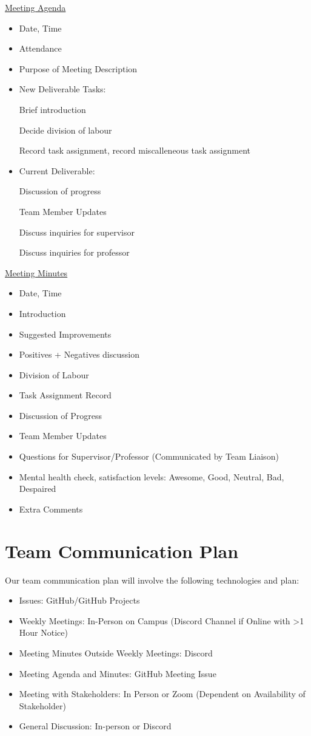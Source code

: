 \documentclass{article}
\begin{document}
\underline{Meeting Agenda}

\begin{itemize}
  \item Date, Time
  \item Attendance
  \item Purpose of Meeting Description
  \item New Deliverable Tasks: \par
  Brief introduction \par
  Decide division of labour \par
  Record task assignment, record miscalleneous task assignment \par
  \item Current Deliverable: \par
  Discussion of progress \par
  Team Member Updates \par
  Discuss inquiries for supervisor \par
  Discuss inquiries for professor \par
\end{itemize}

\underline{Meeting Minutes}

\begin{itemize}
  \item Date, Time
  \item Introduction
  \item Suggested Improvements
  \item Positives + Negatives discussion
  \item Division of Labour
  \item Task Assignment Record
  \item Discussion of Progress
  \item Team Member Updates
  \item Questions for Supervisor/Professor (Communicated by Team Liaison)
  \item Mental health check, satisfaction levels: Awesome, Good, Neutral, Bad, Despaired
  \item Extra Comments
\end{itemize}

\section{Team Communication Plan}

Our team communication plan will involve the following technologies and plan:
\begin{itemize}
  \item Issues: GitHub/GitHub Projects
  \item Weekly Meetings: In-Person on Campus (Discord Channel if Online with >1 Hour Notice)
  \item Meeting Minutes Outside Weekly Meetings: Discord
  \item Meeting Agenda and Minutes: GitHub Meeting Issue
  \item Meeting with Stakeholders: In Person or Zoom (Dependent on Availability of Stakeholder)
  \item General Discussion: In-person or Discord
\end{itemize}
\end{document}
